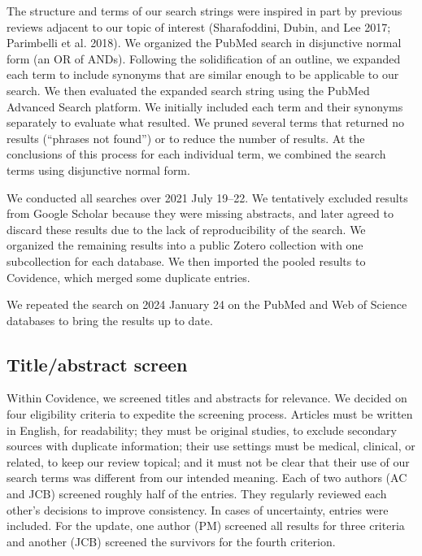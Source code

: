 \documentclass{article}
\begin{document}
The structure and terms of our search strings were inspired in part by
previous reviews adjacent to our topic of interest (Sharafoddini, Dubin,
and Lee 2017; Parimbelli et al. 2018). We organized the PubMed search in
disjunctive normal form (an OR of ANDs). Following the solidification of
an outline, we expanded each term to include synonyms that are similar
enough to be applicable to our search. We then evaluated the expanded
search string using the PubMed Advanced Search platform. We initially
included each term and their synonyms separately to evaluate what
resulted. We pruned several terms that returned no results (``phrases
not found'') or to reduce the number of results. At the conclusions of
this process for each individual term, we combined the search terms
using disjunctive normal form.

We conducted all searches over 2021 July 19--22. We tentatively excluded
results from Google Scholar because they were missing abstracts, and
later agreed to discard these results due to the lack of reproducibility
of the search. We organized the remaining results into a public Zotero
collection with one subcollection for each database. We then imported
the pooled results to Covidence, which merged some duplicate entries.

We repeated the search on 2024 January 24 on the PubMed and Web of
Science databases to bring the results up to date.

\hypertarget{titleabstract-screen}{%
\subsection{Title/abstract screen}\label{titleabstract-screen}}

Within Covidence, we screened titles and abstracts for relevance. We
decided on four eligibility criteria to expedite the screening process.
Articles must be written in English, for readability; they must be
original studies, to exclude secondary sources with duplicate
information; their use settings must be medical, clinical, or related,
to keep our review topical; and it must not be clear that their use of
our search terms was different from our intended meaning. Each of two
authors (AC and JCB) screened roughly half of the entries. They
regularly reviewed each other's decisions to improve consistency. In
cases of uncertainty, entries were included. For the update, one author
(PM) screened all results for three criteria and another (JCB) screened
the survivors for the fourth criterion.
\end{document}
